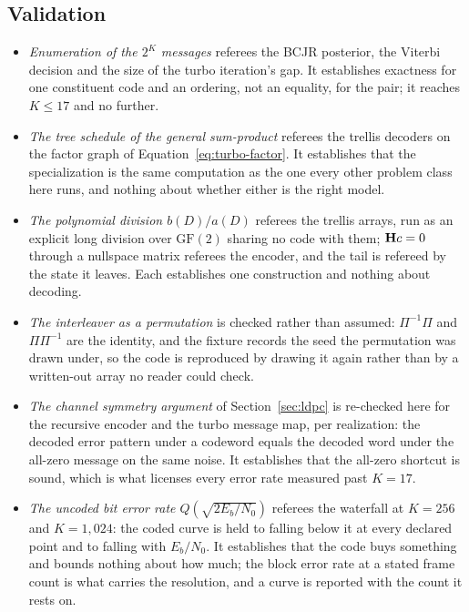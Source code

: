 \documentclass[11pt,a4paper]{article}
\begin{document}


\subsection{Validation}
\label{sec:turbo:validation}
\begin{itemize}
  \item \emph{Enumeration of the $2^{K}$ messages} referees the BCJR
    posterior, the Viterbi decision and the size of the turbo iteration's
    gap. It establishes exactness for one constituent code and an ordering,
    not an equality, for the pair; it reaches $K \le 17$ and no further.
  \item \emph{The tree schedule of the general sum-product} referees the
    trellis decoders on the factor graph of
    Equation~\ref{eq:turbo-factor}. It establishes that the specialization
    is the same computation as the one every other problem class here runs,
    and nothing about whether either is the right model.
  \item \emph{The polynomial division $b(D)/a(D)$} referees the trellis
    arrays, run as an explicit long division over $\mathrm{GF}(2)$ sharing
    no code with them; $\mathbf{H} c = 0$ through a nullspace matrix referees
    the encoder, and the tail is refereed by the state it leaves. Each
    establishes one construction and nothing about decoding.
  \item \emph{The interleaver as a permutation} is checked rather than
    assumed: $\Pi^{-1}\Pi$ and $\Pi\Pi^{-1}$ are the identity, and the
    fixture records the seed the permutation was drawn under, so the code
    is reproduced by drawing it again rather than by a written-out array no
    reader could check.
  \item \emph{The channel symmetry argument} of Section~\ref{sec:ldpc} is
    re-checked here for the recursive encoder and the turbo message map,
    per realization: the decoded error pattern under a codeword equals the
    decoded word under the all-zero message on the same noise. It
    establishes that the all-zero shortcut is sound, which is what licenses
    every error rate measured past $K = 17$.
  \item \emph{The uncoded bit error rate $Q(\sqrt{2 E_b/N_0})$} referees the
    waterfall at $K = 256$ and $K = 1{,}024$: the coded curve is held to
    falling below it at every declared point and to falling with
    $E_b/N_0$. It establishes that the code buys something and bounds
    nothing about how much; the block error rate at a stated frame count is
    what carries the resolution, and a curve is reported with the count it
    rests on.
\end{itemize}
\end{document}
